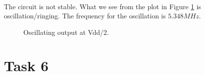 \documentclass[a4paper,english,11pt]{article}
\begin{document}
\\
The circuit is not stable. What we see from the plot in Figure \ref{fig:oscil:out} is oscillation/ringing. The frequency for the oscillation is
$5.348 MHz$.
\begin{figure}[!htbp]
 \centering
  \caption{Oscillating output at Vdd/2.}
  \label{fig:oscil:out}	
\end{figure}

\section{Task 6}
\end{document}
